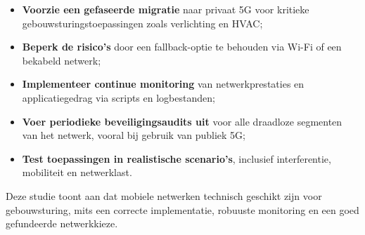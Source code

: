 \begin{itemize}
    \item \textbf{Voorzie een gefaseerde migratie} naar privaat 5G voor kritieke gebouwsturingstoepassingen zoals verlichting en HVAC;
    \item \textbf{Beperk de risico’s} door een fallback-optie te behouden via Wi-Fi of een bekabeld netwerk;
    \item \textbf{Implementeer continue monitoring} van netwerkprestaties en applicatiegedrag via scripts en logbestanden;
    \item \textbf{Voer periodieke beveiligingsaudits uit} voor alle draadloze segmenten van het netwerk, vooral bij gebruik van publiek 5G;
    \item \textbf{Test toepassingen in realistische scenario’s}, inclusief interferentie, mobiliteit en netwerklast.
\end{itemize}

Deze studie toont aan dat mobiele netwerken technisch geschikt zijn voor gebouwsturing, mits een correcte implementatie, robuuste monitoring en een goed gefundeerde netwerkkieze.

